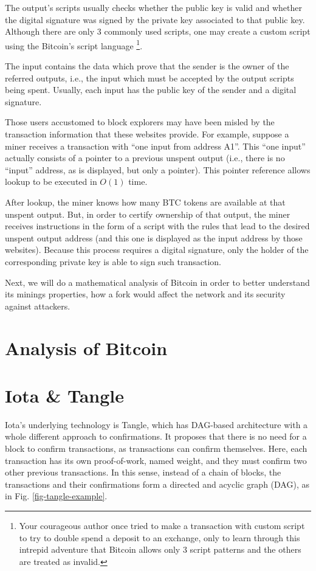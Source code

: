 The output's scripts usually checks whether the public key is valid and whether the digital signature was signed by the private key associated to that public key. Although there are only 3 commonly used scripts, one may create a custom script using the Bitcoin's script language \footnote{Your courageous author once tried to make a transaction with custom script to try to double spend a deposit to an exchange, only to learn through this intrepid adventure that Bitcoin allows only 3 script patterns and the others are treated as invalid.}.

The input contains the data which prove that the sender is the owner of the referred outputs, i.e., the input which must be accepted by the output scripts being spent. Usually, each input has the public key of the sender and a digital signature.

Those users accustomed to block explorers may have been misled by the transaction information that these websites provide.  For example, suppose a miner receives a transaction with ``one input from address A1''.  This ``one input'' actually consists of a pointer to a previous unspent output (i.e., there is no ``input'' address, as is displayed, but only a pointer). This pointer reference allows lookup to be executed in $O(1)$ time.

After lookup, the miner knows how many BTC tokens are available at that unspent output.  But, in order to certify ownership of that output, the miner receives instructions in the form of a script with the rules that lead to the desired unspent output address (and this one is displayed as the input address by those websites). Because this process requires a digital signature, only the holder of the corresponding private key is able to sign such transaction.

Next, we will do a mathematical analysis of Bitcoin in order to better understand its minings properties, how a fork would affect the network and its security against attackers.

\chapter{Analysis of Bitcoin}


\chapter{Iota \& Tangle}

Iota's underlying technology is Tangle, which has DAG-based architecture with a whole different approach to confirmations. It proposes that there is no need for a block to confirm transactions, as transactions can confirm themselves. Here, each transaction has its own proof-of-work, named weight, and they must confirm two other previous transactions. In this sense, instead of a chain of blocks, the transactions and their confirmations form a directed and acyclic graph (DAG), as in Fig. \ref{fig-tangle-example}.

